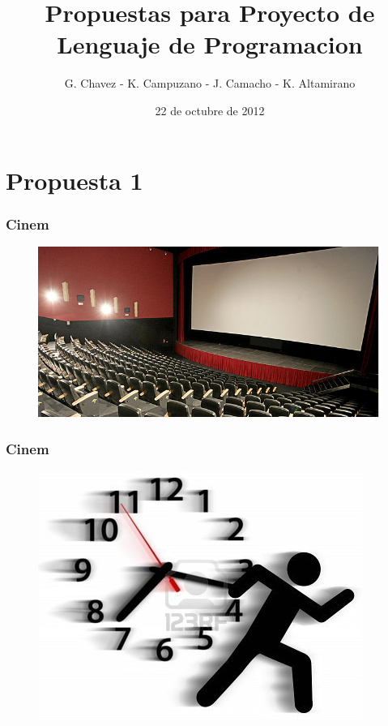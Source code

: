 \documentclass{beamer}
\title{Propuestas para Proyecto de Lenguaje de Programacion}
\author{G. Chavez - K. Campuzano - J. Camacho - K. Altamirano}
\date{22 de octubre de 2012}
\begin{document}
\frame{\titlepage}

\section[Indice]{}
\begin{frame}[allowframebreaks]
\tableofcontents
\end{frame}

\section{Propuesta 1}
\begin{frame}[allowframebreaks]
\frametitle{Cinem}
\begin{figure}[h]
\centering
\includegraphics[height=0.5\textheight]{salacine.jpg}
\end{figure}
\end{frame}

\begin{frame}[allowframbreaks]
\frametitle{Cinem}
\begin{figure}[h]
\centering
\includegraphics[height=0.5\textheight]{apuro.jpg}
\end{figure}
\end{frame}
\end{document}
